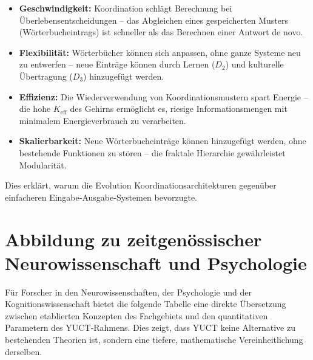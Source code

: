 \documentclass[12pt,a4paper]{article}
\newcommand{\eff}{\mathrm{eff}}
\newcommand{\Ke}{K_{\eff}}
\begin{document}
	\begin{itemize}
		\item \textbf{Geschwindigkeit:} Koordination schlägt Berechnung bei Überlebensentscheidungen – das Abgleichen eines gespeicherten Musters (Wörterbucheintrags) ist schneller als das Berechnen einer Antwort de novo.
		\item \textbf{Flexibilität:} Wörterbücher können sich anpassen, ohne ganze Systeme neu zu entwerfen – neue Einträge können durch Lernen ($D_2$) und kulturelle Übertragung ($D_3$) hinzugefügt werden.
		\item \textbf{Effizienz:} Die Wiederverwendung von Koordinationsmustern spart Energie – die hohe $\Ke$ des Gehirns ermöglicht es, riesige Informationsmengen mit minimalem Energieverbrauch zu verarbeiten.
		\item \textbf{Skalierbarkeit:} Neue Wörterbucheinträge können hinzugefügt werden, ohne bestehende Funktionen zu stören – die fraktale Hierarchie gewährleistet Modularität.
	\end{itemize}
	
	Dies erklärt, warum die Evolution Koordinationsarchitekturen gegenüber einfacheren Eingabe‑Ausgabe‑Systemen bevorzugte.
	
	\section{Abbildung zu zeitgenössischer Neurowissenschaft und Psychologie}
	
	Für Forscher in den Neurowissenschaften, der Psychologie und der Kognitionswissenschaft bietet die folgende Tabelle eine direkte Übersetzung zwischen etablierten Konzepten des Fachgebiets und den quantitativen Parametern des YUCT‑Rahmens. Dies zeigt, dass YUCT keine Alternative zu bestehenden Theorien ist, sondern eine tiefere, mathematische Vereinheitlichung derselben.
	
\end{document}
